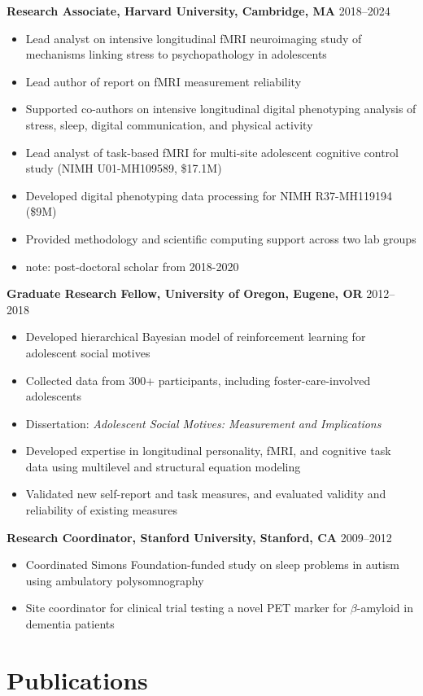 \documentclass[
  10pt,
  letterpaper,
  DIV=11,
  numbers=noendperiod]{scrartcl}
\providecommand{\tightlist}{%
  \setlength{\itemsep}{0pt}\setlength{\parskip}{0pt}}\usepackage{longtable,booktabs,array}
\newcommand{\entry}[2]{%
  \noindent \textbf{#1} \hfill {\small #2}
}
\begin{document}
\entry{Research Associate, Harvard University, Cambridge, MA}{2018–2024}

\begin{itemize}
\tightlist
\item
  Lead analyst on intensive longitudinal fMRI neuroimaging study of
  mechanisms linking stress to psychopathology in adolescents
\item
  Lead author of report on fMRI measurement reliability
\item
  Supported co-authors on intensive longitudinal digital phenotyping
  analysis of stress, sleep, digital communication, and physical
  activity
\item
  Lead analyst of task-based fMRI for multi-site adolescent cognitive
  control study (NIMH U01-MH109589, \$17.1M)
\item
  Developed digital phenotyping data processing for NIMH R37-MH119194
  (\$9M)
\item
  Provided methodology and scientific computing support across two lab
  groups
\item
  note: post-doctoral scholar from 2018-2020
\end{itemize}

\entry{Graduate Research Fellow, University of Oregon, Eugene, OR}{2012–2018}

\begin{itemize}
\tightlist
\item
  Developed hierarchical Bayesian model of reinforcement learning for
  adolescent social motives
\item
  Collected data from 300+ participants, including foster-care-involved
  adolescents
\item
  Dissertation: \emph{Adolescent Social Motives: Measurement and
  Implications}
\item
  Developed expertise in longitudinal personality, fMRI, and cognitive
  task data using multilevel and structural equation modeling
\item
  Validated new self-report and task measures, and evaluated validity
  and reliability of existing measures
\end{itemize}

\entry{Research Coordinator, Stanford University, Stanford, CA}{2009–2012}

\begin{itemize}
\tightlist
\item
  Coordinated Simons Foundation-funded study on sleep problems in autism
  using ambulatory polysomnography
\item
  Site coordinator for clinical trial testing a novel PET marker for
  \(\beta\)-amyloid in dementia patients
\end{itemize}

\section{Publications}\label{publications}

\printbibliography[heading=none]
\end{document}
